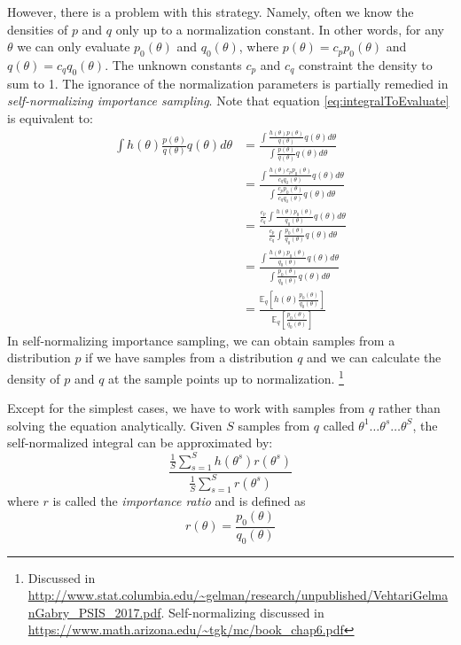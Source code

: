 \documentclass[a4paper,12pt,twoside]{article}
\begin{document}
However, there is a problem with this strategy. Namely, often we know the densities of $p$ and $q$ only up to a normalization constant. In other words, for any $\theta$ we can only evaluate $p_0(\theta)$ and $q_0(\theta)$, where $p(\theta) = c_p p_0(\theta)$ and $q(\theta) = c_q q_0(\theta)$. The unknown constants $c_p$ and $c_q$ constraint the density to sum to 1. The ignorance of the normalization parameters is partially remedied in \textit{self-normalizing importance sampling}. Note that equation \ref{eq:integralToEvaluate} is equivalent to:
\begin{align*}\label{eq:continuousImportanceSampling}
\int h(\theta) \frac{p(\theta)}{q(\theta)} q(\theta) d\theta 
& = 
\frac{\int \frac{h(\theta) p(\theta)}{q(\theta)} q(\theta) d\theta}{\int \frac{p(\theta)}{q(\theta)}q(\theta)d\theta} \\
& = 
\frac{\int \frac{h(\theta) c_p p_0(\theta)}{c_q q_0(\theta)} q(\theta) d\theta}{\int \frac{c_p p_0(\theta)}{c_q q_0(\theta)}q(\theta)d\theta} \\
& = 
\frac{\frac{c_p}{c_q} \int \frac{h(\theta) p_0(\theta)}{q_0(\theta)} q(\theta) d\theta}{\frac{c_p}{c_q}\int \frac{p_0(\theta)}{ q_0(\theta)} q(\theta)d\theta} \\
& = 
\frac{\int \frac{h(\theta) p_0(\theta)}{q_0(\theta)} q(\theta) d\theta}{\int \frac{p_0(\theta)}{ q_0(\theta)} q(\theta)d\theta} \\
& =
\frac{\mathbb{E}_q \left[ h(\theta) \frac{p_0(\theta)}{q_0(\theta)} \right]}{\mathbb{E}_q \left[ \frac{p_0(\theta)}{ q_0(\theta)}\right]}
\end{align*}
In self-normalizing importance sampling, we can obtain samples from a distribution $p$ if we have samples from a distribution $q$ and we can calculate the density of $p$ and $q$ at the sample points up to normalization. \footnote{Discussed in \url{http://www.stat.columbia.edu/~gelman/research/unpublished/VehtariGelmanGabry_PSIS_2017.pdf}. Self-normalizing discussed in \url{https://www.math.arizona.edu/~tgk/mc/book_chap6.pdf}}

Except for the simplest cases, we have to work with samples from $q$ rather than solving the equation analytically. Given $S$ samples from $q$ called $\theta^1 \dots \theta^s \dots \theta^S$, the self-normalized integral can be approximated by:
\begin{equation}\label{eq:approxImportanceSampling}
\frac{\frac{1}{S}\sum_{s=1}^S h(\theta^s) r(\theta^s)}{\frac{1}{S}\sum_{s=1}^S r(\theta^s)}
\end{equation}
where $r$ is called the \textit{importance ratio} and is defined as 
\begin{equation}
r(\theta) = \frac{p_0(\theta)}{q_0(\theta)}
\end{equation}
\end{document}
